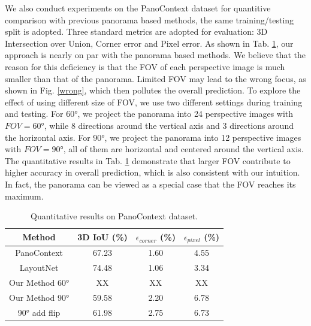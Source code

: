 We also conduct experiments on the PanoContext dataset for quantitive comparison with previous panorama based methods, the same training/testing split is adopted. Three standard metrics are adopted for evaluation: 3D Intersection over Union, Corner error and Pixel error. As shown in Tab. \ref{tab:PC}, our approach is nearly on par with the panorama based methods. We believe that the reason for this deficiency is that the FOV of each perspective image is much smaller than that of the panorama. Limited FOV may lead to the wrong focus, as shown in Fig. \ref{wrong}, which then pollutes the overall prediction. To explore the effect of using different size of FOV, we use two different settings during training and testing. For \ang{60}, we project the panorama into 24 perspective images with $FOV=\ang{60}$, while 8 directions around the vertical axis and 3 directions around the horizontal axis. For \ang{90}, we project the panorama into 12 perspective images with $FOV=\ang{90}$, all of them are horizontal and centered around the vertical axis. The quantitative results in Tab. \ref{tab:PC} demonstrate that larger FOV contribute to higher accuracy in overall prediction, which is also consistent with our intuition. In fact, the panorama can be viewed as a special case that the FOV reaches its maximum.






\begin{table}
	\caption{Quantitative results on PanoContext dataset.}
	\label{tab:PC}
	\begin{tabular}{cccc}
		\toprule
		Method&3D IoU (\%)& $\epsilon_{corner}$ (\%) & $\epsilon_{pixel}$ (\%)\\
		\midrule
		PanoContext \cite{zhang2014panocontext} & 67.23 & 1.60 & 4.55\\
		LayoutNet \cite{zou2018layoutnet} & 74.48 & 1.06 & 3.34\\
		Our Method \ang{60} & XX & XX & XX\\	
		Our Method \ang{90} & 59.58 & 2.20 & 6.78\\	
		\ang{90} add flip & 61.98 & 2.75 & 6.73\\	
		\bottomrule
	\end{tabular}
\end{table}

